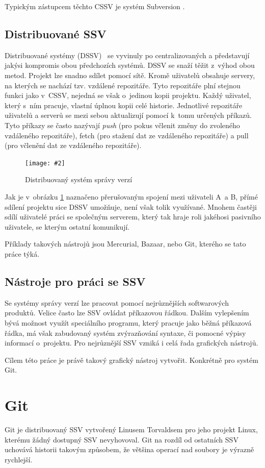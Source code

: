 \documentclass[
  biblatex,
  glossaries,
  index
]{kidiplom}
\newcommand{\pic}[4]{
\begin{figure}[h]
\centering
\texttt{[image: \#2]}
\caption{#3}
\label{fig:#4}
\end{figure}}
\begin{document}
Typickým zástupcem těchto CSSV je systém Subversion \cite{svn}.

\subsection{Distribuované SSV}
Distribuované systémy (DSSV)~\cite{otte} se vyvinuly po centralizovaných a představují 
jakýsi kompromis obou předchozích systémů. DSSV se snaží těžit z~výhod obou 
metod. Projekt lze snadno sdílet pomocí sítě. Kromě uživatelů obsahuje 
servery, na kterých se nachází tzv. vzdálené repozitáře. Tyto repozitáře 
plní stejnou funkci jako v~CSSV, nejedná se však o~jedinou kopii projektu.
Každý uživatel, který s~ním pracuje, vlastní úplnou kopii
celé historie. Jednotlivé repozitáře uživatelů a serverů se mezi sebou 		
aktualizují pomocí k~tomu určených příkazů. Tyto příkazy se často nazývají
{\it push} (pro pokus včlenit změny do zvoleného vzdáleného repozitáře), fetch
(pro stažení dat ze vzdáleného repozitáře) a pull (pro včlenění dat ze 
vzdáleného repozitáře).

\pic{10cm}{distributed.png}{Distribuovaný systém správy verzí}{distributed}

Jak je v~obrázku \ref{fig:distributed} \cite{gitreference} naznačeno přerušovaným spojení mezi uživateli A~a B, přímé sdílení projektu sice DSSV umožňuje, není však tolik využívané. Mnohem častěji sdílí uživatelé práci se společným serverem, který tak hraje roli jakéhosi pasivního uživatele, se kterým ostatní komunikují.

Příklady takových nástrojů jsou Mercurial\cite{mercurial}, Bazaar\cite{bazaar}, nebo Git\cite{git}, kterého se
tato práce týká.

\subsection{Nástroje pro práci se SSV}
Se systémy správy verzí lze pracovat pomocí nejrůznějších softwarových produktů. Velice často lze SSV ovládat příkazovou řádkou. Dalším vylepšením bývá možnost využít speciálního programu, který pracuje jako běžná příkazová řádka, má však zabudovaný systém zvýrazňování syntaxe, či pomocné výpisy informací o~projektu. Pro nejrůznější SSV vzniká i celá řada grafických nástrojů.

Cílem této práce je právě takový grafický nástroj vytvořit. Konkrétně pro systém Git.

\section{Git}
Git je distribuovaný SSV vytvořený Linusem Torvaldsem pro jeho projekt Linux, kterému žádný dostupný SSV nevyhovoval. Git na rozdíl od ostatních SSV uchovává historii   takovým způsobem, že většina operací nad soubory je výrazně rychlejší.
\end{document}
